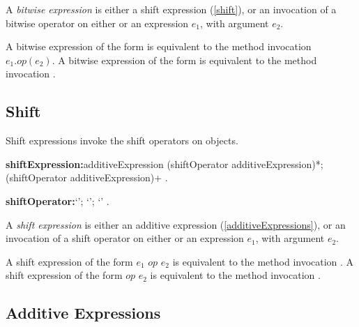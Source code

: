 \documentclass{article}
\begin{document}
\LMHash{}
A {\em bitwise expression} is either a shift expression (\ref{shift}), or an invocation of a bitwise operator on either \SUPER{} or an expression $e_1$, with argument $e_2$.

\LMHash{}
A bitwise expression of the form  is equivalent to the method invocation $e_1.op(e_2)$.
A bitwise expression of the form  is equivalent to the method invocation .



\subsection{Shift}

\LMHash{}
Shift expressions invoke the shift operators on objects.

\begin{grammar}
{\bf shiftExpression:}additiveExpression (shiftOperator additiveExpression)*;
  \SUPER{} (shiftOperator additiveExpression)+
  .

{\bf shiftOperator:}`{\escapegrammar \lt\lt'};
  `{\escapegrammar \gt\gt}';
  `{\escapegrammar \gt \gt \gt}'
  .
\end{grammar}

\LMHash{}
A {\em shift expression} is either an additive expression (\ref{additiveExpressions}), or an invocation of a shift operator on either \SUPER{} or an expression $e_1$, with argument $e_2$.

\LMHash{}
A shift expression of the form $e_1$ $op$ $e_2$ is equivalent to the method invocation .
A shift expression of the form \SUPER{} $op$ $e_2$ is equivalent to the method invocation .



\subsection{Additive Expressions}
\end{document}
